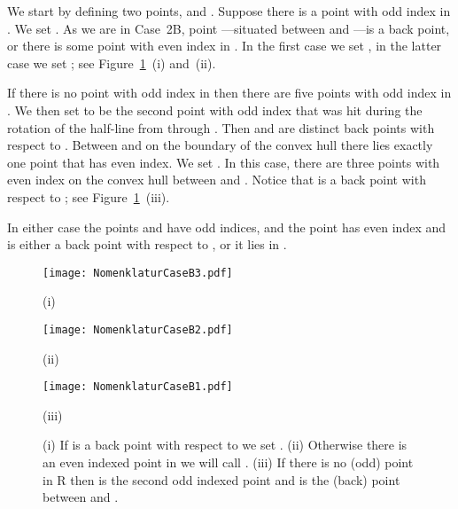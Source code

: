 \documentclass[11pt]{article}
\begin{document}
We start by defining two points,  and . 
Suppose there is a point with odd index in . We set . 
As we are in Case~2B, point ---situated between  and ---is a back point,
or there is some point  with even index in . 
In the first case we set , in the latter case we set ; see Figure~\ref{NomenklaturCaseB-fig}~(i) and~(ii).

If there is no point with odd index in  then there are five points with odd index in . We then set  to be the second point with 
odd index that was hit during the rotation of the half-line from  through . 
Then  and   are distinct back points with respect to . 
Between  and  on the boundary of the convex hull there lies exactly one point  that has even index. We set .
In this case, there are three points with even index on the convex hull between  and .
Notice that  is a back point with respect to ; see Figure~\ref{NomenklaturCaseB-fig}~(iii).

In either case the points  and  have odd indices, and the point  has even index and is either 
a back point with respect to , or it lies in .


\begin{figure}[hbtp]\begin{minipage}[t]{0.26\textwidth}
\begin{center}\texttt{[image: NomenklaturCaseB3.pdf]}

(i)
\end{center}\end{minipage}
\hfill
\begin{minipage}[t]{0.37\textwidth}
\begin{center}\texttt{[image: NomenklaturCaseB2.pdf]}

(ii)
\end{center}\end{minipage}
\hfill
\begin{minipage}[t]{0.28\textwidth}
\begin{center}\texttt{[image: NomenklaturCaseB1.pdf]}

(iii)
\end{center}\end{minipage}
\caption{(i) If  is a back point with respect to  we set . 
(ii) Otherwise there is an even indexed point in  we will
call .
(iii) If there is no (odd) point in R then  is the second odd indexed point and  is the (back) point between  and .}
\label{NomenklaturCaseB-fig}
\end{figure}
\end{document}
